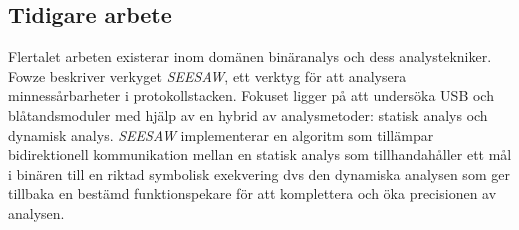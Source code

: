 \subsection{Tidigare arbete}
Flertalet arbeten existerar inom domänen binäranalys och dess analystekniker. Fowze \cite{fowze_mem_vul}
beskriver verkyget \emph{SEESAW}, ett verktyg för att analysera
minnessårbarheter i protokollstacken. Fokuset ligger på att undersöka USB och
blåtandsmoduler med hjälp av en hybrid av analysmetoder: statisk analys och
dynamisk analys. \emph{SEESAW} implementerar en algoritm som tillämpar
bidirektionell kommunikation mellan en statisk analys som tillhandahåller ett
mål i binären till en riktad symbolisk exekvering dvs den dynamiska analysen som
ger tillbaka en bestämd funktionspekare för att komplettera och öka precisionen
av analysen.  
